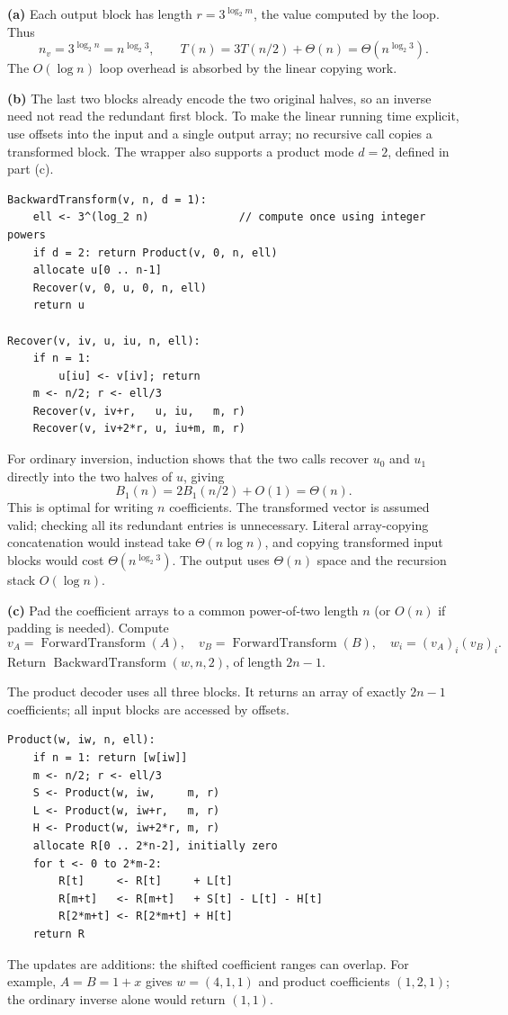 \documentclass[11pt]{article}
\begin{document}
\textbf{(a)} Each output block has length
$r=3^{\log_2m}$, the value computed by the loop. Thus
\[
 n_v=3^{\log_2 n}=n^{\log_2 3},\qquad
 T(n)=3T(n/2)+\Theta(n)=\boxed{\Theta(n^{\log_2 3})}.
\]
The $O(\log n)$ loop overhead is absorbed by the linear copying work.

\textbf{(b)} The last two blocks already encode the two original halves,
so an inverse need not read the redundant first block. To make the linear
running time explicit, use offsets into the input and a single output array;
no recursive call copies a transformed block. The wrapper also supports a
product mode $d=2$, defined in part (c).

\begin{verbatim}
BackwardTransform(v, n, d = 1):
    ell <- 3^(log_2 n)              // compute once using integer powers
    if d = 2: return Product(v, 0, n, ell)
    allocate u[0 .. n-1]
    Recover(v, 0, u, 0, n, ell)
    return u

Recover(v, iv, u, iu, n, ell):
    if n = 1:
        u[iu] <- v[iv]; return
    m <- n/2; r <- ell/3
    Recover(v, iv+r,   u, iu,   m, r)
    Recover(v, iv+2*r, u, iu+m, m, r)
\end{verbatim}

For ordinary inversion, induction shows that the two calls recover $u_0$
and $u_1$ directly into the two halves of $u$, giving
\[
 B_1(n)=2B_1(n/2)+O(1)=\boxed{\Theta(n)}.
\]
This is optimal for writing $n$ coefficients. The transformed vector is
assumed valid; checking all its redundant entries is unnecessary. Literal
array-copying concatenation would instead take $\Theta(n\log n)$, and
copying transformed input blocks would cost $\Theta(n^{\log_2 3})$.
The output uses $\Theta(n)$ space and the recursion stack $O(\log n)$.

\textbf{(c)} Pad the coefficient arrays to a common power-of-two length $n$
(or $O(n)$ if padding is needed). Compute
\[
 v_A=\operatorname{ForwardTransform}(A),\quad
 v_B=\operatorname{ForwardTransform}(B),\quad
 w_i=(v_A)_i(v_B)_i.
\]
Return $\operatorname{BackwardTransform}(w,n,2)$, of length $2n-1$.

\newpage
The product decoder uses all three blocks. It returns an array of exactly
$2n-1$ coefficients; all input blocks are accessed by offsets.
\begin{verbatim}
Product(w, iw, n, ell):
    if n = 1: return [w[iw]]
    m <- n/2; r <- ell/3
    S <- Product(w, iw,     m, r)
    L <- Product(w, iw+r,   m, r)
    H <- Product(w, iw+2*r, m, r)
    allocate R[0 .. 2*n-2], initially zero
    for t <- 0 to 2*m-2:
        R[t]     <- R[t]     + L[t]
        R[m+t]   <- R[m+t]   + S[t] - L[t] - H[t]
        R[2*m+t] <- R[2*m+t] + H[t]
    return R
\end{verbatim}
The updates are additions: the shifted coefficient ranges can overlap.
For example, $A=B=1+x$ gives $w=(4,1,1)$ and product coefficients
$(1,2,1)$; the ordinary inverse alone would return $(1,1)$.
\end{document}
